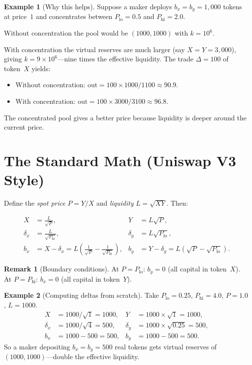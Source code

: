 \documentclass[11pt]{article}
\theoremstyle{definition}
\newtheorem{remark}{Remark}
\newtheorem{example}{Example}
\begin{document}
\begin{example}[Why this helps]\label{ex:why-concentrate}
Suppose a maker deploys $b_x = b_y = 1{,}000$ tokens at price~$1$
and concentrates between $P_{\mathrm{lo}} = 0.5$ and $P_{\mathrm{hi}} = 2.0$.

Without concentration the pool would be $(1000, 1000)$ with $k = 10^6$.

With concentration the virtual reserves are much larger (say $X = Y = 3{,}000$),
giving $k = 9 \times 10^6$---nine times the effective liquidity.
The trade $\Delta = 100$ of token~$X$ yields:
\begin{itemize}
\item Without concentration:
  $\mathrm{out} = 100 \times 1000 / 1100 \approx 90.9$.
\item With concentration:
  $\mathrm{out} = 100 \times 3000 / 3100 \approx 96.8$.
\end{itemize}
The concentrated pool gives a better price because liquidity is deeper around
the current price.
\end{example}


\section{The Standard Math (Uniswap V3 Style)}\label{sec:standard-math}

Define the \emph{spot price} $P = Y/X$ and \emph{liquidity}
$L = \sqrt{XY}$.  Then:

\begin{align}
X &= \frac{L}{\sqrt{P}}, &  Y &= L\sqrt{P},  \label{eq:virtual} \\[4pt]
\delta_x &= \frac{L}{\sqrt{P_{\mathrm{hi}}}}, &
\delta_y &= L\sqrt{P_{\mathrm{lo}}},  \label{eq:offsets} \\[4pt]
b_x &= X - \delta_x = L\!\left(\frac{1}{\sqrt{P}}
      - \frac{1}{\sqrt{P_{\mathrm{hi}}}}\right), &
b_y &= Y - \delta_y = L\!\left(\sqrt{P}
      - \sqrt{P_{\mathrm{lo}}}\right).  \label{eq:real}
\end{align}

\begin{remark}[Boundary conditions]
At $P = P_{\mathrm{lo}}$: $b_y = 0$ (all capital in token~$X$).
At $P = P_{\mathrm{hi}}$: $b_x = 0$ (all capital in token~$Y$).
\end{remark}

\begin{example}[Computing deltas from scratch]\label{ex:deltas-from-scratch}
Take $P_{\mathrm{lo}} = 0.25$, $P_{\mathrm{hi}} = 4.0$, $P = 1.0$, $L = 1000$.
\begin{align*}
X &= 1000 / \sqrt{1} = 1000, & Y &= 1000 \times \sqrt{1} = 1000,\\
\delta_x &= 1000 / \sqrt{4} = 500, & \delta_y &= 1000 \times \sqrt{0.25} = 500,\\
b_x &= 1000 - 500 = 500, & b_y &= 1000 - 500 = 500.
\end{align*}
So a maker depositing $b_x = b_y = 500$ real tokens gets virtual reserves of
$(1000, 1000)$---double the effective liquidity.
\end{example}
\end{document}
